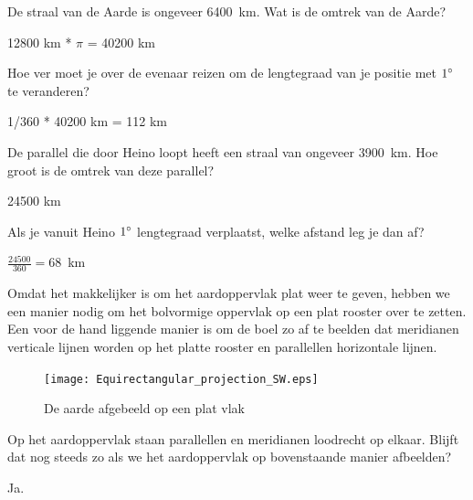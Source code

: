 \begin{opgave}
	\begin{subopgave}
		De straal van de Aarde is ongeveer 6400~km. Wat is de omtrek van de Aarde?
		\begin{antwoord}
			12800 km * $\pi$ = 40200 km
		\end{antwoord}			
	\end{subopgave}
	\begin{subopgave}
		Hoe ver moet je over de evenaar reizen om de lengtegraad van je positie met $1\degree$ te veranderen?
		\begin{antwoord}
			1/360 * 40200 km = 112 km
		\end{antwoord}
	\end{subopgave}
	\begin{subopgave}
		De parallel die door Heino loopt heeft een straal van ongeveer 3900~km. Hoe groot is de omtrek van deze parallel?
		\begin{antwoord}
			24500 km
		\end{antwoord}
	\end{subopgave}
	\begin{subopgave}
		Als je vanuit Heino $1\degree$ lengtegraad verplaatst, welke afstand leg je dan af?
		\begin{antwoord}
			$\frac{24500}{360} = 68$~km
		\end{antwoord}
	\end{subopgave}
\end{opgave}

Omdat het makkelijker is om het aardoppervlak plat weer te geven, hebben we een manier nodig om het bolvormige oppervlak op een plat rooster over te zetten. Een voor de hand liggende manier is om de boel zo af te beelden dat meridianen verticale lijnen worden op het platte rooster en parallellen horizontale lijnen.

\begin{figure}[h]
	\centering
	\texttt{[image: Equirectangular\_projection\_SW.eps]}
	\caption{De aarde afgebeeld op een plat vlak}
	\label{fig_equirect}
\end{figure}

\begin{opgave}
	Op het aardoppervlak staan parallellen en meridianen loodrecht op elkaar. Blijft dat nog steeds zo als we het aardoppervlak op bovenstaande manier afbeelden?
	\begin{antwoord}
		Ja.
	\end{antwoord}
\end{opgave}

